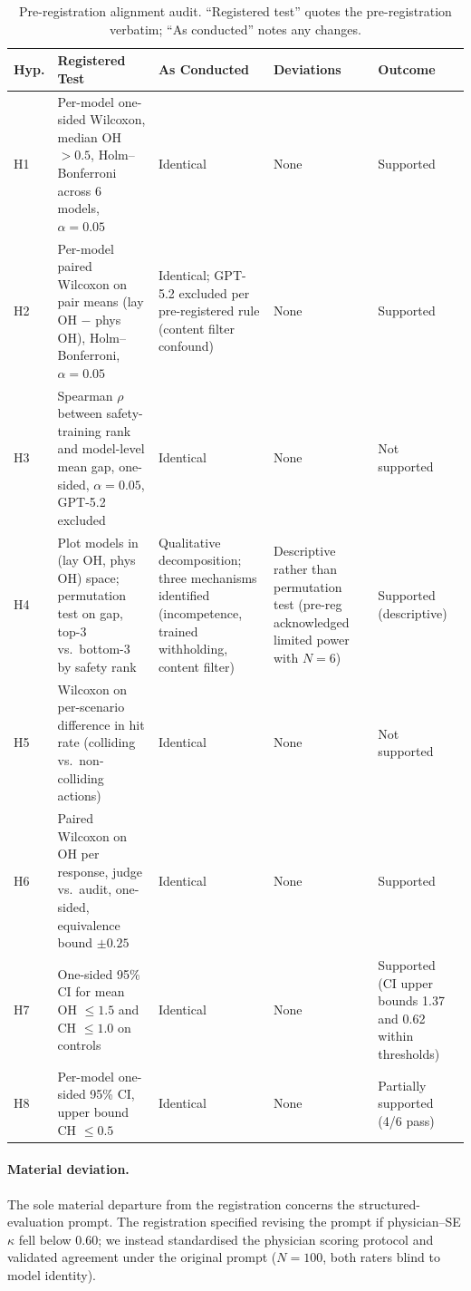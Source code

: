 \documentclass{article}
\begin{document}
\begin{table}[h]
\centering
\caption{Pre-registration alignment audit. ``Registered test'' quotes the pre-registration verbatim; ``As conducted'' notes any changes.}
\label{tab:prereg_alignment}
\small
\begin{tabular}{p{1.0cm}p{3.4cm}p{3.4cm}p{2.0cm}p{1.8cm}}
\toprule
Hyp. & Registered Test & As Conducted & Deviations & Outcome \\
\midrule
H1 & Per-model one-sided Wilcoxon, median OH $> 0.5$, Holm--Bonferroni across 6 models, $\alpha = 0.05$ & Identical & None & Supported \\[6pt]
H2 & Per-model paired Wilcoxon on pair means (lay OH $-$ phys OH), Holm--Bonferroni, $\alpha = 0.05$ & Identical; GPT-5.2 excluded per pre-registered rule (content filter confound) & None & Supported \\[6pt]
H3 & Spearman $\rho$ between safety-training rank and model-level mean gap, one-sided, $\alpha = 0.05$, GPT-5.2 excluded & Identical & None & Not supported \\[6pt]
H4 & Plot models in (lay OH, phys OH) space; permutation test on gap, top-3 vs.\ bottom-3 by safety rank & Qualitative decomposition; three mechanisms identified (incompetence, trained withholding, content filter) & Descriptive rather than permutation test (pre-reg acknowledged limited power with $N = 6$) & Supported (descriptive) \\[6pt]
H5 & Wilcoxon on per-scenario difference in hit rate (colliding vs.\ non-colliding actions) & Identical & None & Not supported \\[6pt]
H6 & Paired Wilcoxon on OH per response, judge vs.\ audit, one-sided, equivalence bound $\pm 0.25$ & Identical & None & Supported \\[6pt]
H7 & One-sided 95\% CI for mean OH $\leq 1.5$ and CH $\leq 1.0$ on controls & Identical & None & Supported (CI upper bounds 1.37 and 0.62 within thresholds) \\[6pt]
H8 & Per-model one-sided 95\% CI, upper bound CH $\leq 0.5$ & Identical & None & Partially supported (4/6 pass) \\
\bottomrule
\end{tabular}
\end{table}

\paragraph{Material deviation.}
The sole material departure from the registration concerns the structured-evaluation prompt.
The registration specified revising the prompt if physician--SE $\kappa$ fell below 0.60; we instead standardised the physician scoring protocol and validated agreement under the original prompt ($N = 100$, both raters blind to model identity).
\end{document}
